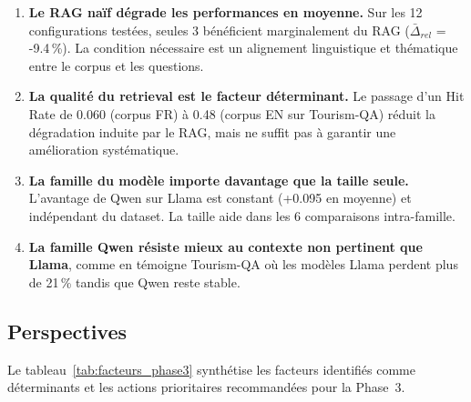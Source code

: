 \documentclass[12pt,a4paper]{article}
\begin{document}
\begin{enumerate}[leftmargin=*]
  \item \textbf{Le RAG na\"if d\'egrade les performances en moyenne.} Sur les 12 configurations test\'ees, seules 3 b\'en\'eficient marginalement du RAG ($\bar{\Delta}_{rel}$ = -9.4\,\%). La condition n\'ecessaire est un alignement linguistique et th\'ematique entre le corpus et les questions.

  \item \textbf{La qualit\'e du retrieval est le facteur d\'eterminant.} Le passage d'un Hit Rate de 0.060 (corpus FR) \`a 0.48 (corpus EN sur Tourism-QA) r\'eduit la d\'egradation induite par le RAG, mais ne suffit pas \`a garantir une am\'elioration syst\'ematique.

  \item \textbf{La famille du mod\`ele importe davantage que la taille seule.} L'avantage de Qwen sur Llama est constant (+0.095 en moyenne) et ind\'ependant du dataset. La taille aide dans les 6 comparaisons intra-famille.

  \item \textbf{La famille Qwen r\'esiste mieux au contexte non pertinent que Llama}, comme en t\'emoigne Tourism-QA o\`u les mod\`eles Llama perdent plus de 21\,\% tandis que Qwen reste stable.
\end{enumerate}

\subsection{Perspectives}

Le tableau~\ref{tab:facteurs_phase3} synthétise les facteurs identifiés comme 
déterminants et les actions prioritaires recommandées pour la Phase~3.
\end{document}
